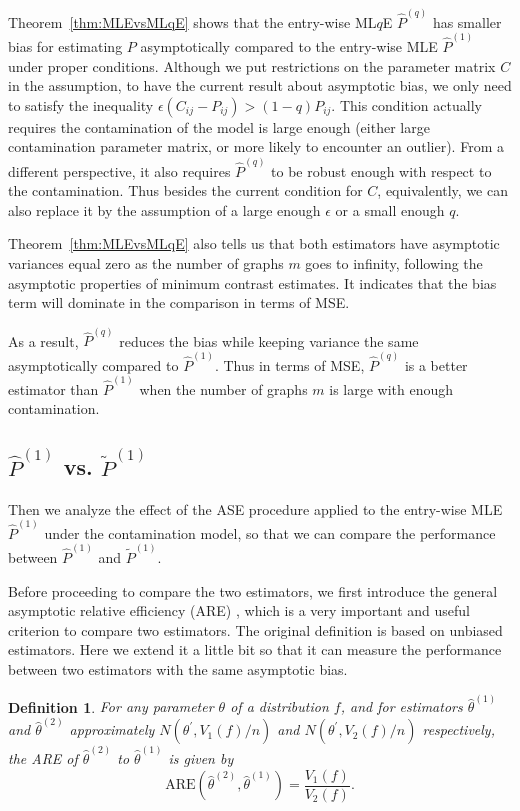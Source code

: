 \documentclass[a4paper]{article}
\newtheorem{definition}[fact]{Definition}
\renewcommand{\hat}{\widehat}
\begin{document}
Theorem~\ref{thm:MLEvsMLqE} shows that the entry-wise ML$q$E $\hat{P}^{(q)}$ has smaller bias for estimating $P$ asymptotically compared to the entry-wise MLE $\hat{P}^{(1)}$ under proper conditions. Although we put restrictions on the parameter matrix $C$ in the assumption, to have the current result about asymptotic bias, we only need to satisfy the inequality $\epsilon (C_{ij} - P_{ij}) > (1 - q) P_{ij}$. This condition actually requires the contamination of the model is large enough (either large contamination parameter matrix, or more likely to encounter an outlier). From a different perspective, it also requires $\hat{P}^{(q)}$ to be robust enough with respect to the contamination. Thus besides the current condition for $C$, equivalently, we can also replace it by the assumption of a large enough $\epsilon$ or a small enough $q$.

Theorem~\ref{thm:MLEvsMLqE} also tells us that both estimators have asymptotic variances equal zero as the number of graphs $m$ goes to infinity, following the asymptotic properties of minimum contrast estimates. It indicates that the bias term will dominate in the comparison in terms of MSE.

As a result, $\hat{P}^{(q)}$ reduces the bias while keeping variance the same asymptotically compared to $\hat{P}^{(1)}$. Thus in terms of MSE, $\hat{P}^{(q)}$ is a better estimator than $\hat{P}^{(1)}$ when the number of graphs $m$ is large with enough contamination.

\subsection{$\hat{P}^{(1)}$ vs. $\widetilde{P}^{(1)}$}
Then we analyze the effect of the ASE procedure applied to the entry-wise MLE $\hat{P}^{(1)}$ under the contamination model, so that we can compare the performance between $\hat{P}^{(1)}$ and $\widetilde{P}^{(1)}$.

Before proceeding to compare the two estimators, we first introduce the general asymptotic relative efficiency (ARE) \citep{serfling2011asymptotic}, which is a very important and useful criterion to compare two estimators. The original definition is based on unbiased estimators. Here we extend it a little bit so that it can measure the performance between two estimators with the same asymptotic bias.
\begin{definition}
For any parameter $\theta$ of a distribution $f$, and for estimators $\hat{\theta}^{(1)}$ and $\hat{\theta}^{(2)}$ approximately $N(\theta^{\prime}, V_1(f)/n)$ and $N(\theta^{\prime}, V_2(f)/n)$ respectively, the ARE of $\hat{\theta}^{(2)}$ to $\hat{\theta}^{(1)}$ is given by
\[
	\mathrm{ARE}(\hat{\theta}^{(2)}, \hat{\theta}^{(1)}) = \frac{V_1(f)}{V_2(f)}.
\]
\end{definition}
\end{document}
